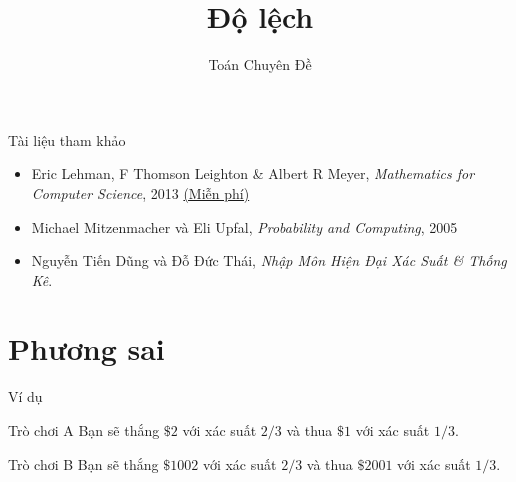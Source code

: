 
\title{Độ lệch}  
\author{Toán Chuyên Đề}   

\maketitle    

\begin{frame}{Tài liệu tham khảo} 
  \begin{itemize}
  \item Eric Lehman, F Thomson Leighton \& Albert R Meyer,
    \textit{Mathematics for Computer Science}, 2013
    \href{https://www.seas.harvard.edu/courses/cs20/MIT6_042Notes.pdf}{\color{blue}(Miễn
      phí)}
  \item Michael Mitzenmacher và Eli Upfal, \textit{Probability and Computing}, 2005
  \item  Nguyễn Tiến Dũng và Đỗ Đức Thái, \textit{Nhập Môn Hiện Đại Xác Suất \& Thống Kê}.
  \end{itemize}
\end{frame}

\section{Phương sai}
\begin{frame}{Ví dụ}
  \begin{center}
    \begin{block}{Trò chơi A}
      Bạn sẽ thắng $\$2$ với xác suất $2/3$ và thua $\$1$ với xác suất $1/3$.
    \end{block}
    \begin{block}{Trò chơi B}
      Bạn sẽ thắng $\$1002$ với xác suất $2/3$ và thua $\$2001$ với xác suất $1/3$.		
    \end{block}
  \end{center}
      
\end{frame}

